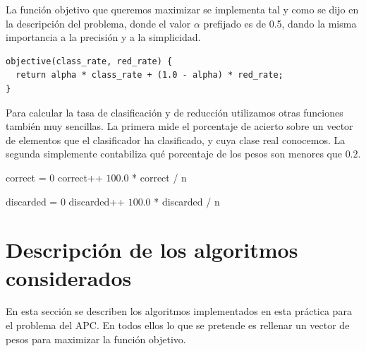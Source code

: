 \documentclass[12pt]{article}
\begin{document}
La función objetivo que queremos maximizar se implementa tal y como se dijo en la descripción del problema, donde el valor $\alpha$ prefijado es de 0.5, dando la misma importancia a la precisión y a la simplicidad.

\begin{verbatim}
objective(class_rate, red_rate) {
  return alpha * class_rate + (1.0 - alpha) * red_rate;
}
\end{verbatim}

Para calcular la tasa de clasificación y de reducción utilizamos otras funciones también muy sencillas. La primera mide el porcentaje de acierto sobre un vector de elementos que el clasificador ha clasificado, y cuya clase real conocemos. La segunda simplemente contabiliza qué porcentaje de los pesos son menores que $0.2$.

\begin{algorithm}[h!]
\begin{algorithmic}

    \State correct = $0$
      
            \State correct++
        \EndIf
    \EndFor
    \State \Return $100.0$ * correct / n
\EndFunction

\end{algorithmic}
\end{algorithm}

\vspace{-1em}

\begin{algorithm}[h!]
\begin{algorithmic}

    \State discarded = $0$
      
            \State discarded++
        \EndIf
    \EndFor
    \State \Return $100.0$ * discarded / n
\EndFunction

\end{algorithmic}
\end{algorithm}


\newpage
\section{Descripción de los algoritmos considerados}
En esta sección se describen los algoritmos implementados en esta práctica para el problema del APC. En todos ellos lo que se pretende es rellenar un vector de pesos para maximizar la función objetivo.
\end{document}
